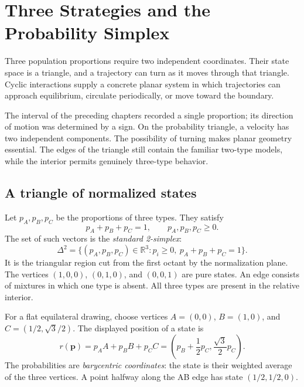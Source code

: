\documentclass[11pt,oneside,openany]{book}
\theoremstyle{definition}
\theoremstyle{remark}
\newcommand{\R}{\mathbb{R}}
\newcommand{\p}{\mathbf{p}}
\numberwithin{equation}{chapter}
\begin{document}
\mainmatter
\setcounter{chapter}{2}
\chapter{Three Strategies and the Probability Simplex}
\label{ch:simplex}

Three population proportions require two independent coordinates. Their state space is a triangle, and a trajectory can turn as it moves through that triangle. Cyclic interactions supply a concrete planar system in which trajectories can approach equilibrium, circulate periodically, or move toward the boundary.

The interval of the preceding chapters recorded a single proportion; its direction of motion was determined by a sign. On the probability triangle, a velocity has two independent components. The possibility of turning makes planar geometry essential. The edges of the triangle still contain the familiar two-type models, while the interior permits genuinely three-type behavior.

\section{A triangle of normalized states}
Let $p_A,p_B,p_C$ be the proportions of three types. They satisfy
\[
p_A+p_B+p_C=1,\qquad p_A,p_B,p_C\geq0.
\]
The set of such vectors is the \emph{standard 2-simplex}:
\[
\Delta^2=\{(p_A,p_B,p_C)\in\R^3:p_i\geq0,\ p_A+p_B+p_C=1\}.
\]
It is the triangular region cut from the first octant by the normalization plane. The vertices $(1,0,0)$, $(0,1,0)$, and $(0,0,1)$ are pure states. An edge consists of mixtures in which one type is absent. All three types are present in the relative interior.

For a flat equilateral drawing, choose vertices $A=(0,0)$, $B=(1,0)$, and $C=(1/2,\sqrt3/2)$. The displayed position of a state is
\begin{equation}\label{eq:barycentric}
r(\p)=p_AA+p_BB+p_CC=\left(p_B+\frac12p_C,\frac{\sqrt3}{2}p_C\right).
\end{equation}
The probabilities are \emph{barycentric coordinates}: the state is their weighted average of the three vertices. A point halfway along the AB edge has state $(1/2,1/2,0)$.
\end{document}
